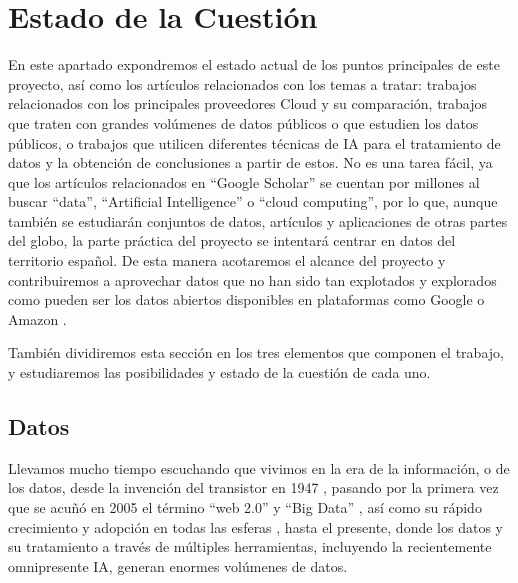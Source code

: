 \chapter{Estado de la Cuestión}
\label{cap:estadoDeLaCuestion}


\vspace{1cm}

En este apartado expondremos el estado actual de los puntos principales de este proyecto, así como los artículos relacionados con los temas a tratar: trabajos relacionados con los principales proveedores Cloud y su comparación, trabajos que traten con grandes volúmenes de datos públicos o que estudien los datos públicos, o trabajos que utilicen diferentes técnicas de IA para el tratamiento de datos y la obtención de conclusiones a partir de estos. No es una tarea fácil, ya que los artículos relacionados en ``Google Scholar'' se cuentan por millones al buscar ``data'', ``Artificial Intelligence'' o ``cloud computing'', por lo que, aunque también se estudiarán conjuntos de datos, artículos y aplicaciones de otras partes del globo, la parte práctica del proyecto se intentará centrar en datos del territorio español. De esta manera acotaremos el alcance del proyecto y contribuiremos a aprovechar datos que no han sido tan explotados y explorados como pueden ser los datos abiertos disponibles en plataformas como Google \citep{googleDataCommon} o Amazon \citep{AWSDataCommon}.

También dividiremos esta sección en los tres elementos que componen el trabajo, y estudiaremos las posibilidades y estado de la cuestión de cada uno. 

\newpage

\section{Datos}
\label{sec:EstudiosDatos}

Llevamos mucho tiempo escuchando que vivimos en la era de la información, o de los datos, desde la invención del transistor en 1947 \citep{wikiInformationAge}, pasando por la primera vez que se acuñó en 2005 el término ``web 2.0'' y ``Big Data'' \citep{HistoryOfBigData}, así como su rápido crecimiento y adopción en todas las esferas \citep{brown2011you}, hasta el presente, donde los datos y su tratamiento a través de múltiples herramientas, incluyendo la recientemente omnipresente IA, generan enormes volúmenes de datos.

